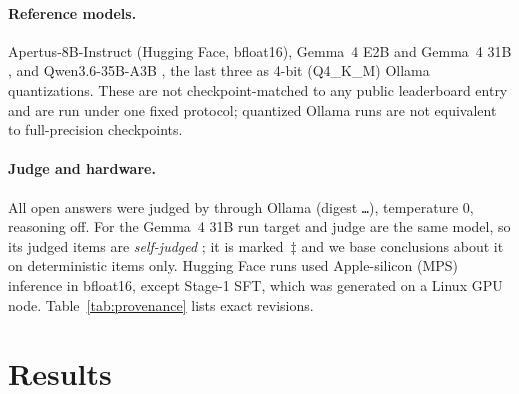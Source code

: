\documentclass[11pt]{article}
\begin{document}
\paragraph{Reference models.} Apertus-8B-Instruct \citep{apertus2025} (Hugging Face, bfloat16), Gemma~4 E2B and Gemma~4 31B \citep{gemma2025gemma3}, and Qwen3.6-35B-A3B \citep{yang2025qwen3}, the last three as 4-bit (Q4\_K\_M) Ollama quantizations. These are not checkpoint-matched to any public leaderboard entry and are run under one fixed protocol; quantized Ollama runs are not equivalent to full-precision checkpoints.

\paragraph{Judge and hardware.} All open answers were judged by \texttt{\judgeId} through Ollama (digest \texttt{\judgeRev\ldots}), temperature 0, reasoning off. For the Gemma~4 31B run target and judge are the same model, so its judged items are \emph{self-judged} \citep{panickssery2024selfpref}; it is marked~$\ddagger$ and we base conclusions about it on deterministic items only. Hugging Face runs used Apple-silicon (MPS) inference in bfloat16, except Stage-1 SFT, which was generated on a Linux GPU node. Table~\ref{tab:provenance} lists exact revisions.

\begin{table}[htbp]
\centering
\small
\caption{Evaluated runs with pinned revisions. All: greedy decoding, seed 42, reasoning off, judge \texttt{\judgeId}.}
\label{tab:provenance}
\resizebox{\linewidth}{!}{}
\end{table}

\section{Results}
\label{sec:results}

\begin{table}[htbp]
\centering
\small
\caption{Overall results (\nItems{} items; Stage-1 SFT 431). Score: mean item score with language-cluster bootstrap 95\% CI. Domain columns: language understanding, quantitative reasoning, grounding \& safety, digital agency, practical communication. Malf.: answers failing a format check; Trunc.: answers that hit the token budget. $\dagger$~one unscored item. $\ddagger$~self-judged on judged items.}
\label{tab:main}
\resizebox{\linewidth}{!}{}
\end{table}
\end{document}
